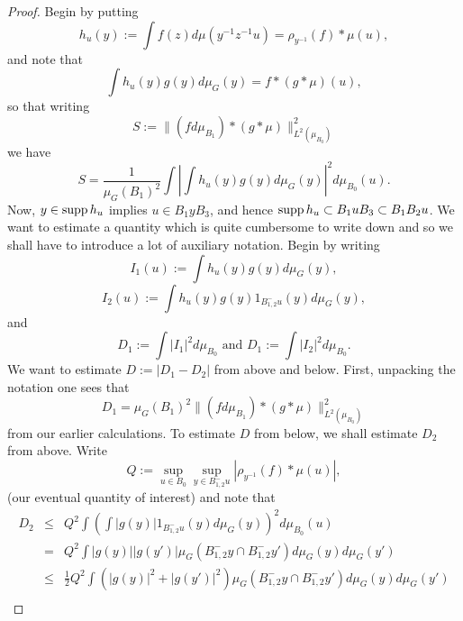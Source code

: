 \documentclass[12pt]{amsart}
\numberwithin{equation}{section}
\theoremstyle{plain}
\theoremstyle{definition}
\renewcommand{\leq}{\leqslant}
\providecommand{\supp}{\mathop{\rm supp}\nolimits}
\begin{document}
\begin{proof}
Begin by putting
\begin{equation*}
h_u(y):=\int{f(z)d\mu(y^{-1}z^{-1}u)} = \rho_{y^{-1}}(f) \ast \mu(u),
\end{equation*}
and note that
\begin{equation*}
\int{h_u(y)g(y)d\mu_G(y)}=f \ast (g \ast \mu)(u),
\end{equation*}
so that writing
\begin{equation*}
S:=\|(fd\mu_{B_1}) \ast (g \ast \mu)\|_{L^2(\mu_{B_0})}^2
\end{equation*}
we have
\begin{equation*}
S=\frac{1}{\mu_G(B_1)^2}\int{|\int{h_u(y)g(y)d\mu_G(y)}|^2d\mu_{B_0}(u)}.
\end{equation*}
Now, $y \in \supp h_u$ implies $u \in B_1yB_3$, and hence $\supp h_u \subset B_1uB_3\subset B_1B_2u$.  We want to estimate a quantity which is quite cumbersome to write down and so we shall have to introduce a lot of auxiliary notation.  Begin by writing
\begin{equation*}
I_1(u):=\int{h_u(y)g(y)d\mu_G(y)} ,
\end{equation*}
\begin{equation*}
I_2(u):=\int{h_u(y)g(y)1_{B_{1,2}^-u}(y)d\mu_G(y)},
\end{equation*}
and
\begin{equation*}
D_1:=\int{|I_1|^2d\mu_{B_0}} \textrm{ and }D_1:=\int{|I_2|^2d\mu_{B_0}} .
\end{equation*}
We want to estimate $D:=|D_1 -D_2|$ from above and below.  First, unpacking the notation one sees that
\begin{equation*}
D_1=\mu_G(B_1)^2\|(fd\mu_{B_1}) \ast (g \ast \mu)\|_{L^2(\mu_{B_0})}^2
\end{equation*}
from our earlier calculations.  To estimate $D$ from below, we shall estimate $D_2$ from above.  Write
\begin{equation*}
Q:=\sup_{u \in B_0}\sup_{y \in B_{1,2}^-u}{|\rho_{y^{-1}}(f) \ast \mu(u)|},
\end{equation*}
(our eventual quantity of interest) and note that
\begin{eqnarray*}
D_2 & \leq &Q^2\int{\left(\int{|g(y)|1_{B_{1,2}^-u}(y)d\mu_G(y)}\right)^2d\mu_{B_0}(u)}\\ 
& = & Q^2\int{|g(y)||g(y')|\mu_G(B_{1,2}^-y \cap B_{1,2}^-y')d\mu_G(y)d\mu_G(y')}\\& \leq & \frac{1}{2}Q^2\int{(|g(y)|^2+|g(y')|^2)\mu_G(B_{1,2}^-y \cap B_{1,2}^-y')d\mu_G(y)d\mu_G(y')}\\

\end{eqnarray*}
\end{proof}
\end{document}
